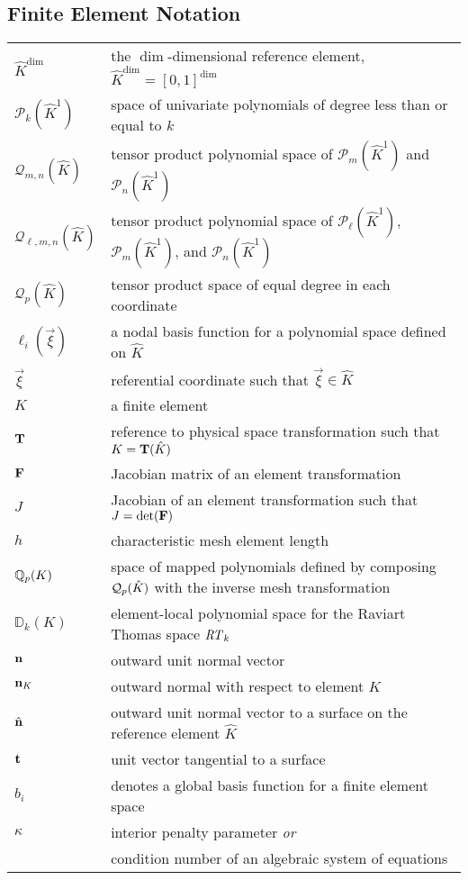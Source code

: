 \documentclass[../doc.tex]{subfiles}
\begin{document}
\subsection*{Finite Element Notation}
\begin{longtable}{p{2cm}p{12cm}}
$\hat{K}^{\dim}$ & the $\dim$-dimensional reference element, $\hat{K}^{\dim} = [0,1]^{\dim}$ \\
$\mathcal{P}_k(\hat{K}^1)$ & space of univariate polynomials of degree less than or equal to $k$ \\
$\mathcal{Q}_{m,n}(\hat{K})$ & tensor product polynomial space of $\mathcal{P}_m(\hat{K}^1)$ and $\mathcal{P}_n(\hat{K}^1)$ \\
$\mathcal{Q}_{\ell,m,n}(\hat{K})$ & tensor product polynomial space of $\mathcal{P}_\ell(\hat{K}^1)$, $\mathcal{P}_m(\hat{K}^1)$, and $\mathcal{P}_n(\hat{K}^1)$ \\
$\mathcal{Q}_p(\hat{K})$ & tensor product space of equal degree in each coordinate \\ 
$\ell_i(\vec{\xi})$ & a nodal basis function for a polynomial space defined on $\hat{K}$ \\
$\vec{\xi}$ & referential coordinate such that $\vec{\xi} \in \hat{K}$ \\
$K$ & a finite element \\
$\boldsymbol{\mathrm{T}}$ & reference to physical space transformation such that $K = \boldsymbol{\mathrm{T}}(\hat{K})$ \\
$\boldsymbol{\mathrm{F}}$ & Jacobian matrix of an element transformation \\
$J$ & Jacobian of an element transformation such that $J = \det(\boldsymbol{\mathrm{F}})$ \\
$h$ & characteristic mesh element length \\
$\mathbb{Q}_{p}(K)$ & space of mapped polynomials defined by composing $\mathcal{Q}_{p}(\hat{K})$ with the inverse mesh transformation \\
$\mathbb{D}_k(K)$ & element-local polynomial space for the Raviart Thomas space $\mathit{RT}_k$ \\
$\boldsymbol{\mathrm{n}}$ & outward unit normal vector \\ 
$\boldsymbol{\mathrm{n}}_K$ & outward normal with respect to element $K$ \\
$\hat{\boldsymbol{\mathrm{n}}}$ & outward unit normal vector to a surface on the reference element $\hat{K}$ \\
$\boldsymbol{\mathrm{t}}$ & unit vector tangential to a surface \\
$b_i$ & denotes a global basis function for a finite element space \\
$\kappa$ & interior penalty parameter \emph{or} \\ 
& condition number of an algebraic system of equations \\


\end{longtable}
\end{document}
